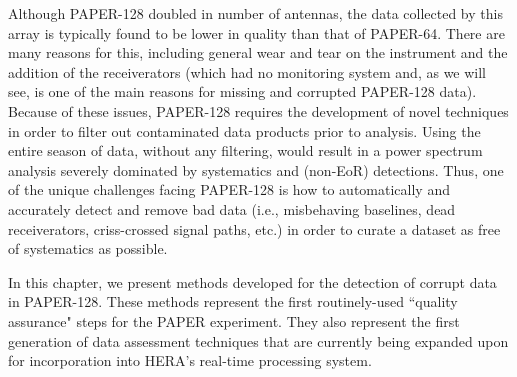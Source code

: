 Although PAPER-128 doubled in number of antennas, the data collected by this array is typically found to be lower in quality than that of PAPER-64. There are many reasons for this, including general wear and tear on the instrument and the addition of the receiverators (which had no monitoring system and, as we will see, is one of the main reasons for missing and corrupted PAPER-128 data). Because of these issues, PAPER-128 requires the development of novel techniques in order to filter out contaminated data products prior to analysis. Using the entire season of data, without any filtering, would result in a power spectrum analysis severely dominated by systematics and (non-EoR) detections. Thus, one of the unique challenges facing PAPER-128 is how to automatically and accurately detect and remove bad data (i.e., misbehaving baselines, dead receiverators, criss-crossed signal paths, etc.) in order to curate a dataset as free of systematics as possible.

In this chapter, we present methods developed for the detection of corrupt data in PAPER-128. These methods represent the first routinely-used ``quality assurance" steps for the PAPER experiment. They also represent the first generation of data assessment techniques that are currently being expanded upon for incorporation into HERA's real-time processing system. 


